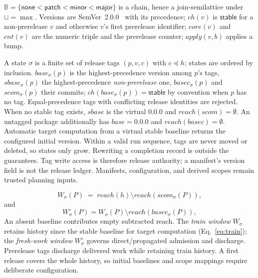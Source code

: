 \begin{definition}
$\mathbb{B} = \{\mathsf{none} < \mathsf{patch} < \mathsf{minor} <
\mathsf{major}\}$ is a chain, hence a join-semilattice under
$\sqcup = \max$. Versions are SemVer~2.0.0~\cite{semver} with its
precedence; $\mathit{ch}(v)$ is $\mathsf{stable}$ for a non-prerelease
$v$ and otherwise $v$'s first prerelease identifier; $\mathit{core}(v)$
and $\mathit{cnt}(v)$ are the numeric triple and the prerelease counter;
$\mathit{apply}(v,b)$ applies a bump.
\end{definition}

\begin{definition}[state]
\label{def:state}
A state $\sigma$ is a finite set of release tags $(p, v, c)$ with
$c \preceq h$; states are ordered by inclusion. $\mathit{base}_\sigma(p)$
is the highest-precedence version among $p$'s tags,
$\mathit{sbase}_\sigma(p)$ the highest-precedence \emph{non-prerelease}
one, $\mathit{basec}_\sigma(p)$ and $\mathit{scom}_\sigma(p)$ their
commits; $\mathit{ch}(\mathit{base}_\sigma(p)) = \mathsf{stable}$ by
convention when $p$ has no tag. Equal-precedence tags with conflicting release identities are rejected.
When no stable tag exists, $\mathit{sbase}$ is the virtual 0.0.0 and
$\mathit{reach}(\mathit{scom})=\emptyset$. An untagged package additionally
has $\mathit{base}=0.0.0$ and $\mathit{reach}(\mathit{basec})=\emptyset$.
Automatic target computation from a virtual stable baseline returns the
configured initial version.
Within a valid run sequence, tags are never moved or deleted, so states only
grow. Rewriting a completion record is outside the guarantees.
Tag write access is therefore release authority; a manifest's version field
is not the release ledger. Manifests, configuration, and derived scopes remain
trusted planning inputs.
\end{definition}

\begin{definition}
\label{def:window}
\begin{equation}
  W_\sigma(P) \;=\; \mathit{reach}(h) \setminus
                    \mathit{reach}(\mathit{scom}_\sigma(P)),
  \label{eq:window}
\end{equation}
and
\begin{equation}
  W^\circ_\sigma(P) = W_\sigma(P) \setminus
                       \mathit{reach}(\mathit{basec}_\sigma(P)),
  \label{eq:fresh}
\end{equation}
An absent baseline contributes empty subtracted reach. The \emph{train window}
$W_\sigma$ retains history since the stable baseline for target computation
(Eq.~\ref{eq:train}); the \emph{fresh-work window} $W^\circ_\sigma$ governs
direct/propagated admission and discharge. Prerelease tags discharge delivered
work while retaining train history. A first release covers the whole history,
so initial baselines and scope mappings require deliberate configuration.
\end{definition}

